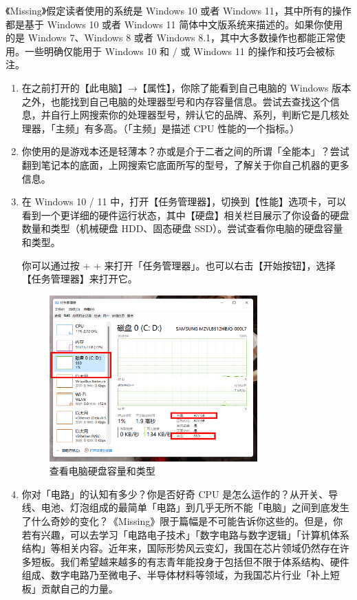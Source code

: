 《Missing》假定读者使用的系统是 Windows 10 或者 Windows 11，其中所有的操作都是基于 Windows 10 或者 Windows 11 简体中文版系统来描述的。如果你使用的是 Windows 7、Windows 8 或者 Windows 8.1，其中大多数操作也都能正常使用。一些明确仅能用于 Windows 10 和 / 或 Windows 11 的操作和技巧会被标注。

\practice

\begin{enumerate}
  \item 在之前打开的【此电脑】→【属性】，你除了能看到自己电脑的 Windows 版本之外，也能找到自己电脑的处理器型号和内存容量信息。尝试去查找这个信息，并自行上网搜索你的处理器型号，辨认它的品牌、系列，判断它是几核处理器，「主频」有多高。（「主频」是描述 CPU 性能的一个指标。）
  \item 你使用的是游戏本还是轻薄本？亦或是介于二者之间的所谓「全能本」？尝试翻到笔记本的底面，上网搜索它底面所写的型号，了解关于你自己机器的更多信息。
  \item 在 Windows 10 / 11 中，打开【任务管理器】，切换到【性能】选项卡，可以看到一个更详细的硬件运行状态，其中【硬盘】相关栏目展示了你设备的硬盘数量和类型（机械硬盘 HDD、固态硬盘 SSD）。尝试查看你电脑的硬盘容量和类型。
  
  你可以通过按  +  +  来打开「任务管理器」。也可以右击【开始按钮】，选择【任务管理器】来打开它。
  \begin{figure}[H]
    \centering
    \includegraphics[width=8cm]{assets/Check_disk_status.png}
    \caption{查看电脑硬盘容量和类型}
    \label{check-disk}
  \end{figure}
  \item 你对「电路」的认知有多少？你是否好奇 CPU 是怎么运作的？从开关、导线、电池、灯泡组成的最简单「电路」到几乎无所不能「电脑」之间到底发生了什么奇妙的变化？《Missing》限于篇幅是不可能告诉你这些的。但是，你若有兴趣，可以去学习「电路电子技术」「数字电路与数字逻辑」「计算机体系结构」等相关内容。近年来，国际形势风云变幻，我国在芯片领域仍然存在许多短板。我们希望越来越多的有志青年能投身于包括但不限于体系结构、硬件组成、数字电路乃至微电子、半导体材料等领域，为我国芯片行业「补上短板」贡献自己的力量。
\end{enumerate}
